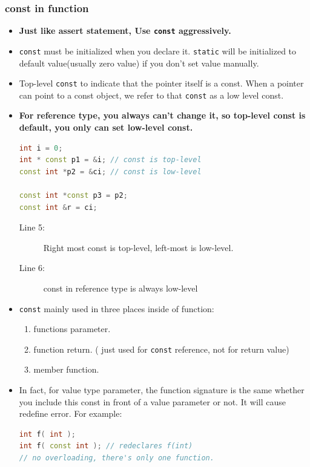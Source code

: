 \documentclass[a4paper,11pt,twoside]{book}
\begin{document}
\subsubsection{const in function}
\begin{itemize}
	\item \textbf{Just like assert statement, Use \texttt{const} aggressively.}
	
	\item \texttt{const} must be initialized when you declare it. \texttt{static} will be initialized to default value(usually zero value) if you don't set value manually. 
	
	\item Top-level \texttt{const} to indicate that the pointer itself is a const. When a pointer can point to a const object, we refer to that \texttt{const} as a low level const.
	
	\item \textbf{For reference type, you always can't change it, so top-level const is default, you only can set low-level const.}
\begin{lstlisting}[frame=single, language=c++]
int i = 0;
int * const p1 = &i; // const is top-level
const int *p2 = &ci; // const is low-level
	
const int *const p3 = p2;
const int &r = ci;
\end{lstlisting}
\begin{description}
	\item[Line 5:] Right most const is top-level, left-most is low-level.
	\item[Line 6:] const in reference type is always low-level
\end{description}
	
	\item \texttt{const} mainly used in three places inside of function:
	\begin{enumerate}
		\item functions parameter.
		\item function return. ( just used for \texttt{const} reference, not for return value)
		\item member function.
	\end{enumerate}
	
	\item In fact, for value type parameter, the function signature is the same whether you include this const in front of a value parameter or not. It will cause redefine error. For example:
\begin{lstlisting}[frame=single, language=c++]
int f( int );
int f( const int ); // redeclares f(int)
// no overloading, there's only one function.
\end{lstlisting}
	

\end{itemize}
\end{document}
